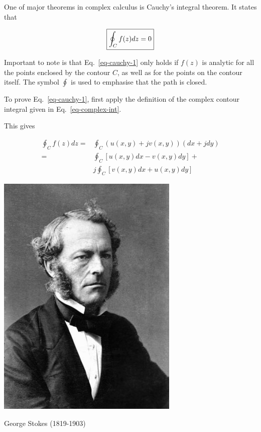 One of major theorems in complex calculus is Cauchy's integral theorem. It states that 

\begin{equation}
\fbox{$\displaystyle
\oint_{{C}} f(z) dz = 0 \label{eq-cauchy-1}
$}
\end{equation}

Important to note is that Eq.~\ref{eq-cauchy-1} only holds if $f(z)$ is analytic for all the points enclosed by the contour ${C}$, as well as for the points on the contour itself. The symbol $\oint$ is used to emphasise that the path is closed.

\begin{cue}
To prove Eq.~\ref{eq-cauchy-1}, first apply the definition of the complex contour integral given in Eq.~\ref{eq-complex-int}.
\end{cue}

This gives

\begin{align}
\oint_{C}f(z)dz = & \oint_{C}\left(u(x,y)+jv(x,y)\right)(dx+jdy)
\nonumber \\
  = & \oint_{C}\left[u(x,y)dx-v(x,y)dy\right] + \nonumber \\
  & j \oint_{C}\left[v(x,y)dx+u(x,y)dy\right]  \label{eq-cauchy-proof}
\end{align}

\begin{marginfigure}[-0.0cm]
  \includegraphics{complex/figures/stokes}
  \caption{George Stokes (1819-1903)}
\end{marginfigure}

